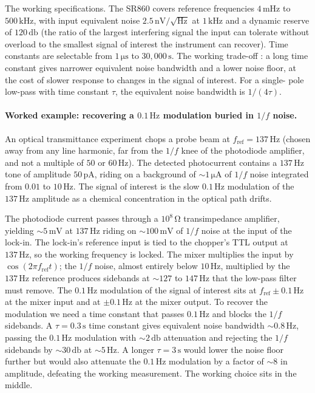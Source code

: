 The working specifications. The SR860 covers reference frequencies
$4 \,\si{\milli\hertz}$ to $500 \,\si{\kilo\hertz}$, with input
equivalent noise $2.5 \,\si{\nano\volt}/\sqrt{\si{\hertz}}$ at $1
\,\si{\kilo\hertz}$ and a dynamic reserve of $120 \,\si{\decibel}$
(the ratio of the largest interfering signal the input can tolerate
without overload to the smallest signal of interest the instrument
can recover). Time constants are selectable from $1 \,\si{\micro
\second}$ to $30{,}000 \,\si{\second}$. The working trade-off
\cite{paper:ch05t3-meade-1983}: a long time constant gives narrower
equivalent noise bandwidth and a lower noise floor, at the cost of
slower response to changes in the signal of interest. For a single-
pole low-pass with time constant $\tau$, the equivalent noise
bandwidth is $1/(4\tau)$.

\paragraph{Worked example: recovering a $0.1 \,\si{\hertz}$
modulation buried in $1/f$ noise.}
An optical transmittance experiment chops a probe beam at
$f_{\text{ref}} = 137 \,\si{\hertz}$ (chosen away from any line
harmonic, far from the $1/f$ knee of the photodiode amplifier, and
not a multiple of $50$ or $60 \,\si{\hertz}$). The detected
photocurrent contains a $137 \,\si{\hertz}$ tone of amplitude
$50 \,\si{\pico\ampere}$, riding on a background of
$\sim 1 \,\si{\micro\ampere}$ of $1/f$ noise integrated from
$0.01$ to $10 \,\si{\hertz}$. The signal of interest is the slow
$0.1 \,\si{\hertz}$ modulation of the $137 \,\si{\hertz}$
amplitude as a chemical concentration in the optical path drifts.

The photodiode current passes through a $10^{8} \,\si{\ohm}$
transimpedance amplifier, yielding $\sim 5 \,\si{\milli\volt}$ at
$137 \,\si{\hertz}$ riding on $\sim 100 \,\si{\milli\volt}$ of
$1/f$ noise at the input of the lock-in. The lock-in's reference
input is tied to the chopper's TTL output at $137 \,\si{\hertz}$,
so the working frequency is locked. The mixer multiplies the input
by $\cos(2\pi f_{\text{ref}} t)$; the $1/f$ noise, almost entirely
below $10 \,\si{\hertz}$, multiplied by the $137 \,\si{\hertz}$
reference produces sidebands at $\sim 127$ to $147 \,\si{\hertz}$
that the low-pass filter must remove. The $0.1 \,\si{\hertz}$
modulation of the signal of interest sits at $f_{\text{ref}} \pm 0.1
\,\si{\hertz}$ at the mixer input and at $\pm 0.1 \,\si{\hertz}$ at
the mixer output. To recover the modulation we need a time constant
that passes $0.1 \,\si{\hertz}$ and blocks the $1/f$ sidebands. A
$\tau = 0.3 \,\si{\second}$ time constant gives equivalent noise
bandwidth $\sim 0.8 \,\si{\hertz}$, passing the $0.1 \,\si{\hertz}$
modulation with $\sim 2 \,\si{\decibel}$ attenuation and rejecting
the $1/f$ sidebands by $\sim 30 \,\si{\decibel}$ at $\sim 5 \,\si
{\hertz}$. A longer $\tau = 3 \,\si{\second}$ would lower the noise
floor further but would also attenuate the $0.1 \,\si{\hertz}$
modulation by a factor of $\sim 8$ in amplitude, defeating the
working measurement. The working choice sits in the middle.

